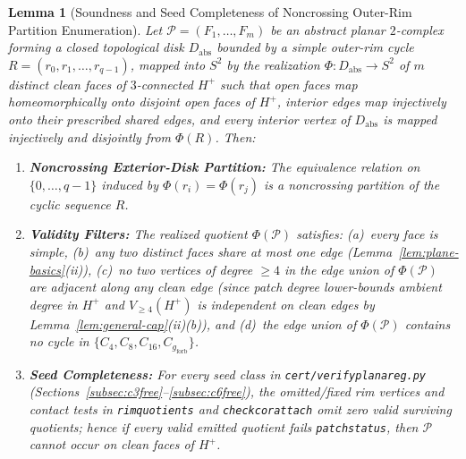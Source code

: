 \documentclass[11pt,reqno]{amsart}
\theoremstyle{plain}
\newtheorem{lemma}[theorem]{Lemma}
\theoremstyle{definition}
\theoremstyle{remark}
\newcommand{\Vge}{V_{\ge 4}}
\DeclareRobustCommand{\_}{\ifmmode\text{\textunderscore}\else\textunderscore\allowbreak\fi}
\begin{document}
\begin{lemma}[Soundness and Seed Completeness of Noncrossing Outer-Rim Partition Enumeration]\label{lem:rim-sound}
Let $\mathcal{P} = (F_1, \dots, F_m)$ be an abstract planar $2$-complex forming a closed topological disk $D_{\mathrm{abs}}$ bounded by a simple outer-rim cycle $R = (r_0, r_1, \dots, r_{q-1})$, mapped into $S^2$ by the realization $\Phi : D_{\mathrm{abs}} \to S^2$ of $m$ distinct clean faces of $3$-connected $H^+$ such that open faces map homeomorphically onto disjoint open faces of $H^+$, interior edges map injectively onto their prescribed shared edges, and every interior vertex of $D_{\mathrm{abs}}$ is mapped injectively and disjointly from $\Phi(R)$. Then:
\begin{enumerate}[label=(\roman*),leftmargin=2.2em]
  \item \textbf{Noncrossing Exterior-Disk Partition:} The equivalence relation on $\{0, \dots, q-1\}$ induced by $\Phi(r_i) = \Phi(r_j)$ is a \emph{noncrossing partition} of the cyclic sequence $R$.
  \item \textbf{Validity Filters:} The realized quotient $\Phi(\mathcal{P})$ satisfies: (a)~every face is simple, (b)~any two distinct faces share at most one edge (Lemma~\ref{lem:plane-basics}(ii)), (c)~no two vertices of degree $\ge 4$ in the edge union of $\Phi(\mathcal{P})$ are adjacent along any clean edge (since patch degree lower-bounds ambient degree in $H^+$ and $\Vge(H^+)$ is independent on clean edges by Lemma~\ref{lem:general-cap}(ii)(b)), and (d)~the edge union of $\Phi(\mathcal{P})$ contains no cycle in $\{C_4, C_8, C_{16}, C_{g_{\mathrm{forb}}}\}$.
  \item \textbf{Seed Completeness:} For every seed class in \texttt{cert/verify\_planar\_eg.py} (Sections~\ref{subsec:c3free}--\ref{subsec:c6free}), the omitted/fixed rim vertices and contact tests in \texttt{rim\_quotients} and \texttt{check\_cor\_attach} omit zero valid surviving quotients; hence if every valid emitted quotient fails \texttt{patch\_status}, then $\mathcal{P}$ cannot occur on clean faces of $H^+$.
\end{enumerate}
\end{lemma}
\end{document}
